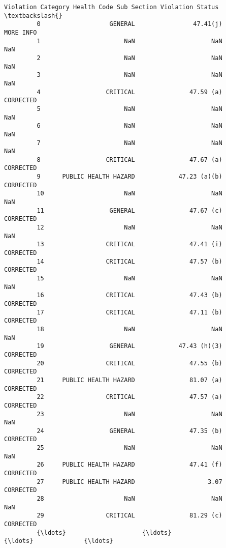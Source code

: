 \documentclass[11pt]{article}
\begin{document}
\begin{Verbatim}[commandchars=\\\{\}]
                  Violation Category Health Code Sub Section Violation Status  \textbackslash{}
         0                   GENERAL                47.41(j)        MORE INFO   
         1                       NaN                     NaN              NaN   
         2                       NaN                     NaN              NaN   
         3                       NaN                     NaN              NaN   
         4                  CRITICAL               47.59 (a)        CORRECTED   
         5                       NaN                     NaN              NaN   
         6                       NaN                     NaN              NaN   
         7                       NaN                     NaN              NaN   
         8                  CRITICAL               47.67 (a)        CORRECTED   
         9      PUBLIC HEALTH HAZARD            47.23 (a)(b)        CORRECTED   
         10                      NaN                     NaN              NaN   
         11                  GENERAL               47.67 (c)        CORRECTED   
         12                      NaN                     NaN              NaN   
         13                 CRITICAL               47.41 (i)        CORRECTED   
         14                 CRITICAL               47.57 (b)        CORRECTED   
         15                      NaN                     NaN              NaN   
         16                 CRITICAL               47.43 (b)        CORRECTED   
         17                 CRITICAL               47.11 (b)        CORRECTED   
         18                      NaN                     NaN              NaN   
         19                  GENERAL            47.43 (h)(3)        CORRECTED   
         20                 CRITICAL               47.55 (b)        CORRECTED   
         21     PUBLIC HEALTH HAZARD               81.07 (a)        CORRECTED   
         22                 CRITICAL               47.57 (a)        CORRECTED   
         23                      NaN                     NaN              NaN   
         24                  GENERAL               47.35 (b)        CORRECTED   
         25                      NaN                     NaN              NaN   
         26     PUBLIC HEALTH HAZARD               47.41 (f)        CORRECTED   
         27     PUBLIC HEALTH HAZARD                    3.07        CORRECTED   
         28                      NaN                     NaN              NaN   
         29                 CRITICAL               81.29 (c)        CORRECTED   
         {\ldots}                     {\ldots}                     {\ldots}              {\ldots}   

\end{Verbatim}
\end{document}
